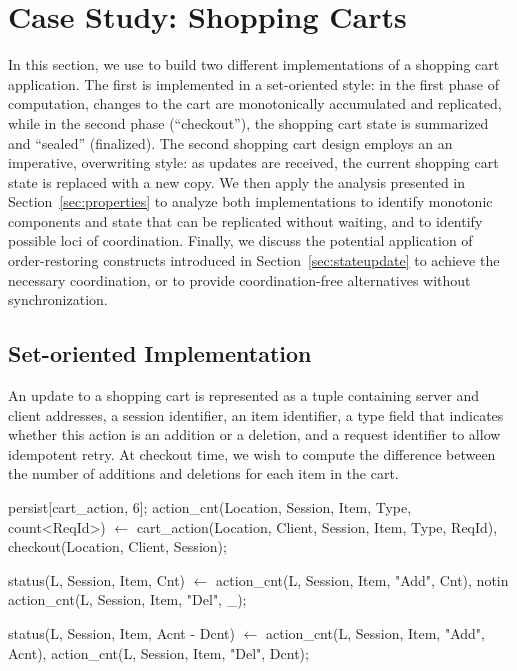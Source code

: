 \section{Case Study: Shopping Carts}
\label{sec:casestudy}

In this section, we use \lang to build two different implementations of a 
shopping cart application.
The first is implemented in a set-oriented style: in the first phase of computation,
changes to the cart are monotonically accumulated and replicated, while in the second
phase (``checkout''), the shopping cart state is summarized and ``sealed'' (finalized).
The second shopping cart design employs an
an imperative, overwriting style: as updates are received, the current shopping cart state
is replaced with a new copy.  We then apply the analysis presented in Section~\ref{sec:properties} 
to analyze both implementations to identify monotonic 
components and state that can be replicated without waiting, and to identify possible
loci of coordination.  Finally, we discuss the potential application of order-restoring
constructs introduced in Section~\ref{sec:stateupdate} to achieve the necessary coordination,
or to provide coordination-free alternatives without synchronization.


\subsection{Set-oriented Implementation}
An update to a shopping cart
is represented as a tuple containing server and client addresses, a session identifier,
an item identifier, a type field that indicates whether this action
is an addition or a deletion, and a request identifier to allow idempotent retry. At checkout time,
we wish to compute the difference between the number of additions and deletions for each item
in the cart.

\begin{Dedalus}
persist[cart_action, 6];
action_cnt(Location, Session, Item,
           Type, count<ReqId>) \(\leftarrow\)
    cart_action(Location, Client, Session,
                Item, Type, ReqId),
    checkout(Location, Client, Session);

status(L, Session, Item, Cnt) \(\leftarrow\)
    action_cnt(L, Session, Item, "Add", Cnt),
    notin action_cnt(L, Session, Item, "Del", _);

status(L, Session, Item, Acnt - Dcnt) \(\leftarrow\)
    action_cnt(L, Session, Item, "Add", Acnt),
    action_cnt(L, Session, Item, "Del", Dcnt);
\end{Dedalus}

